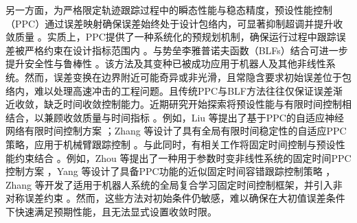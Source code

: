 \documentclass[pdflatex,sn-mathphys-num]{sn-jnl}%
\theoremstyle{thmstyleone}%
\theoremstyle{thmstyletwo}%
\theoremstyle{thmstylethree}%
\begin{document}
另一方面，为严格限定轨迹跟踪过程中的瞬态性能与稳态精度，预设性能控制（PPC）通过误差映射确保误差始终处于设计包络内，可显著抑制超调并提升收敛质量 \cite{BechlioulisRovithakis_2008_Prescribedperformance,Bu_2023_Prescribedperformance}。实质上，PPC提供了一种系统化的预规划机制，确保运行过程中跟踪误差被严格约束在设计指标范围内 \cite{ZhangEtAl_2024_Prescribedperformance,ZhangEtAl_2024_Lowcomplexityprescribed,ZhangChai_2023_Globalprescribed}。与势垒李雅普诺夫函数（BLFs）结合可进一步提升安全性与鲁棒性 \cite{WangEtAl_2024_Prescribedperformance,XieEtAl_2024_Lowcomplexitytracking}。该方法及其变种已被成功应用于机器人及其他非线性系统\cite{DimanidisEtAl_2020_Outputfeedback,WangEtAl_2024_Adaptivefaulttoleranta,LiuEtAl_2023_Reducedorderobserverbased,DimanidisEtAl_2020_Outputfeedback}。然而，误差变换在边界附近可能奇异或非光滑，且常隐含要求初始误差位于包络内，难以处理高速冲击的工程问题。且传统PPC与BLF方法往往仅保证误差渐近收敛，缺乏时间收敛控制能力。近期研究开始探索将预设性能与有限时间控制相结合，以兼顾收敛质量与时间指标 \cite{LiuEtAl_2018_Adaptiveneural,SuiEtAl_2022_Finitetimeadaptive,SunEtAl_2022_Fuzzyadaptive,SongZhou_2018_NeuroadaptiveControl,GaoEtAl_2023_Finitetimefaulttolerant}。例如，Liu 等提出了基于PPC的自适应神经网络有限时间控制方案 \cite{LiuEtAl_2018_Adaptiveneural}；Zhang 等设计了具有全局有限时间稳定性的自适应PPC策略，应用于机械臂跟踪控制 \cite{ZhangEtAl_2024_noveldisturbance}。与此同时，有相关工作将固定时间控制与预设性能约束结合 \cite{LiEtAl_2023_Distributedfixedtime,ZhuEtAl_2023_Fixedtimefuzzy,SunEtAl_2024_Fixedtimeprescribed,YangEtAl_2023_Proximatefixedtime,ZhangEtAl_2023_Globalcomposite}。例如，Zhou 等提出了一种用于参数时变非线性系统的固定时间PPC控制方案 \cite{SunEtAl_2024_Fixedtimeprescribed}，Yang 等设计了具备PPC功能的近似固定时间容错跟踪控制策略 \cite{YangEtAl_2023_Proximatefixedtime,YangSu_2022_Proximatefixedtime}，Zhang 等开发了适用于机器人系统的全局复合学习固定时间控制框架，并引入非对称误差约束 \cite{ZhangEtAl_2023_Globalcomposite}。然而，这些方法对初始条件仍敏感，难以确保在大初值误差条件下快速满足预期性能，且无法显式设置收敛时限。
\end{document}
